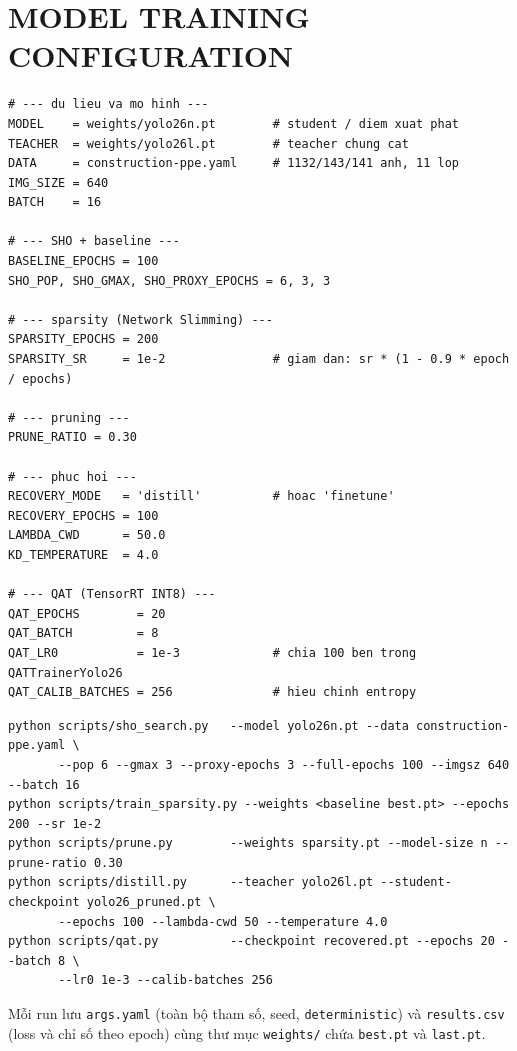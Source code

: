 \chapter{MODEL TRAINING CONFIGURATION}

\begin{lstlisting}[caption={Cấu hình pipeline tối ưu trong notebook}]
# --- du lieu va mo hinh ---
MODEL    = weights/yolo26n.pt        # student / diem xuat phat
TEACHER  = weights/yolo26l.pt        # teacher chung cat
DATA     = construction-ppe.yaml     # 1132/143/141 anh, 11 lop
IMG_SIZE = 640
BATCH    = 16

# --- SHO + baseline ---
BASELINE_EPOCHS = 100
SHO_POP, SHO_GMAX, SHO_PROXY_EPOCHS = 6, 3, 3

# --- sparsity (Network Slimming) ---
SPARSITY_EPOCHS = 200
SPARSITY_SR     = 1e-2               # giam dan: sr * (1 - 0.9 * epoch / epochs)

# --- pruning ---
PRUNE_RATIO = 0.30

# --- phuc hoi ---
RECOVERY_MODE   = 'distill'          # hoac 'finetune'
RECOVERY_EPOCHS = 100
LAMBDA_CWD      = 50.0
KD_TEMPERATURE  = 4.0

# --- QAT (TensorRT INT8) ---
QAT_EPOCHS        = 20
QAT_BATCH         = 8
QAT_LR0           = 1e-3             # chia 100 ben trong QATTrainerYolo26
QAT_CALIB_BATCHES = 256              # hieu chinh entropy
\end{lstlisting}

\begin{lstlisting}[caption={Trình tự lệnh của pipeline}]
python scripts/sho_search.py   --model yolo26n.pt --data construction-ppe.yaml \
       --pop 6 --gmax 3 --proxy-epochs 3 --full-epochs 100 --imgsz 640 --batch 16
python scripts/train_sparsity.py --weights <baseline best.pt> --epochs 200 --sr 1e-2
python scripts/prune.py        --weights sparsity.pt --model-size n --prune-ratio 0.30
python scripts/distill.py      --teacher yolo26l.pt --student-checkpoint yolo26_pruned.pt \
       --epochs 100 --lambda-cwd 50 --temperature 4.0
python scripts/qat.py          --checkpoint recovered.pt --epochs 20 --batch 8 \
       --lr0 1e-3 --calib-batches 256
\end{lstlisting}

Mỗi run lưu \texttt{args.yaml} (toàn bộ tham số, seed, \texttt{deterministic})
và \texttt{results.csv} (loss và chỉ số theo epoch) cùng thư mục
\texttt{weights/} chứa \texttt{best.pt} và \texttt{last.pt}.
